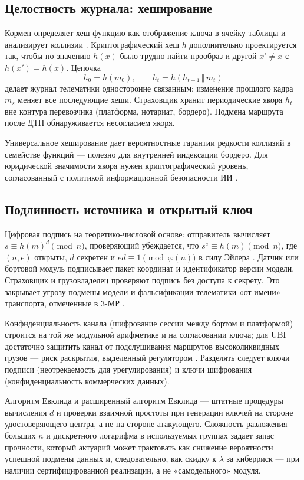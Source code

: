 \documentclass[a4paper,14pt]{extarticle}
\begin{document}
\subsection{Целостность журнала: хеширование}

Кормен определяет хеш-функцию как отображение ключа в ячейку таблицы и анализирует коллизии \cite{cormen}. Криптографический хеш $h$ дополнительно проектируется так, чтобы по значению $h(x)$ было трудно найти прообраз и другой $x'\neq x$ с $h(x')=h(x)$. Цепочка
\[
h_0=h(m_0),\qquad
h_{t}=h(h_{t-1}\,\Vert\, m_t)
\]
делает журнал телематики односторонне связанным: изменение прошлого кадра $m_s$ меняет все последующие хеши. Страховщик хранит периодические якоря $h_t$ вне контура перевозчика (платформа, нотариат, бордеро). Подмена маршрута после ДТП обнаруживается несогласием якоря.

Универсальное хеширование \cite{cormen} дает вероятностные гарантии редкости коллизий в семействе функций --- полезно для внутренней индексации бордеро. Для юридической значимости якоря нужен криптографический уровень, согласованный с политикой информационной безопасности ИИ \cite{cbr}.

\subsection{Подлинность источника и открытый ключ}

Цифровая подпись на теоретико-числовой основе: отправитель вычисляет $s\equiv h(m)^{d}\pmod{n}$, проверяющий убеждается, что $s^e\equiv h(m)\pmod{n}$, где $(n,e)$ открыты, $d$ секретен и $ed\equiv 1\pmod{\varphi(n)}$ в силу Эйлера \cite{borevich, cormen}. Датчик или бортовой модуль подписывает пакет координат и идентификатор версии модели. Страховщик и грузовладелец проверяют подпись без доступа к секрету. Это закрывает угрозу подмены модели и фальсификации телематики «от имени» транспорта, отмеченные в 3-МР \cite{cbr}.

Конфиденциальность канала (шифрование сессии между бортом и платформой) строится на той же модульной арифметике и на согласовании ключа; для UBI достаточно защитить канал от подслушивания маршрутов высоколиквидных грузов --- риск раскрытия, выделенный регулятором \cite{cbr}. Разделять следует ключи подписи (неотрекаемость для урегулирования) и ключи шифрования (конфиденциальность коммерческих данных).

Алгоритм Евклида и расширенный алгоритм Евклида \cite{cormen} --- штатные процедуры вычисления $d$ и проверки взаимной простоты при генерации ключей на стороне удостоверяющего центра, а не на стороне атакующего. Сложность разложения больших $n$ и дискретного логарифма в используемых группах задает запас прочности, который актуарий может трактовать как снижение вероятности успешной подмены данных и, следовательно, как скидку к $\lambda$ за киберриск --- при наличии сертифицированной реализации, а не «самодельного» модуля.
\end{document}

